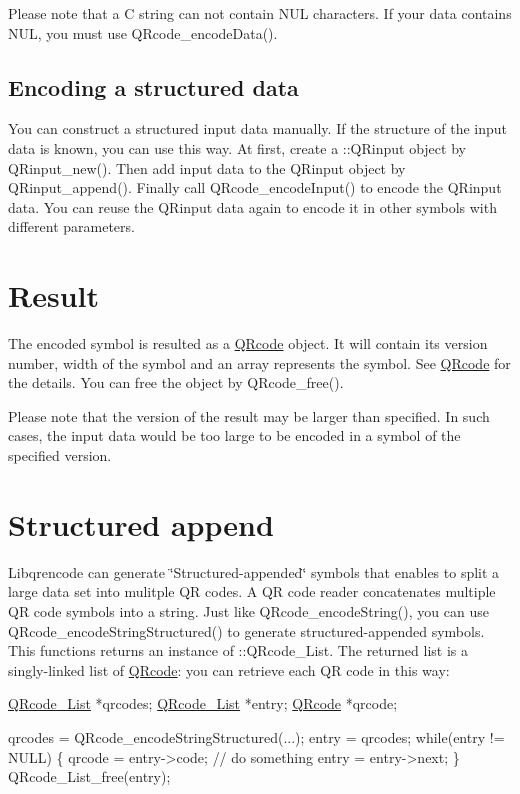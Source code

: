 Please note that a C string can not contain N\+UL characters. If your data contains N\+UL, you must use Q\+Rcode\+\_\+encode\+Data().\hypertarget{index_encoding-input}{}\subsection{Encoding a structured data}\label{index_encoding-input}
You can construct a structured input data manually. If the structure of the input data is known, you can use this way. At first, create a \+::\+Q\+Rinput object by Q\+Rinput\+\_\+new(). Then add input data to the Q\+Rinput object by Q\+Rinput\+\_\+append(). Finally call Q\+Rcode\+\_\+encode\+Input() to encode the Q\+Rinput data. You can reuse the Q\+Rinput data again to encode it in other symbols with different parameters.\hypertarget{index_result}{}\section{Result}\label{index_result}
The encoded symbol is resulted as a \mbox{\hyperlink{struct_q_rcode}{Q\+Rcode}} object. It will contain its version number, width of the symbol and an array represents the symbol. See \mbox{\hyperlink{struct_q_rcode}{Q\+Rcode}} for the details. You can free the object by Q\+Rcode\+\_\+free().

Please note that the version of the result may be larger than specified. In such cases, the input data would be too large to be encoded in a symbol of the specified version.\hypertarget{index_structured}{}\section{Structured append}\label{index_structured}
Libqrencode can generate \char`\"{}\+Structured-\/appended\char`\"{} symbols that enables to split a large data set into mulitple QR codes. A QR code reader concatenates multiple QR code symbols into a string. Just like Q\+Rcode\+\_\+encode\+String(), you can use Q\+Rcode\+\_\+encode\+String\+Structured() to generate structured-\/appended symbols. This functions returns an instance of \+::\+Q\+Rcode\+\_\+\+List. The returned list is a singly-\/linked list of \mbox{\hyperlink{struct_q_rcode}{Q\+Rcode}}\+: you can retrieve each QR code in this way\+:


\begin{DoxyCode}
\mbox{\hyperlink{struct___q_rcode___list}{QRcode\_List}} *qrcodes;
\mbox{\hyperlink{struct___q_rcode___list}{QRcode\_List}} *entry;
\mbox{\hyperlink{struct_q_rcode}{QRcode}} *qrcode;

qrcodes = QRcode\_encodeStringStructured(...);
entry = qrcodes;
\textcolor{keywordflow}{while}(entry != NULL) \{
    qrcode = entry->code;
    \textcolor{comment}{// do something}
    entry = entry->next;
\}
QRcode\_List\_free(entry);
\end{DoxyCode}



